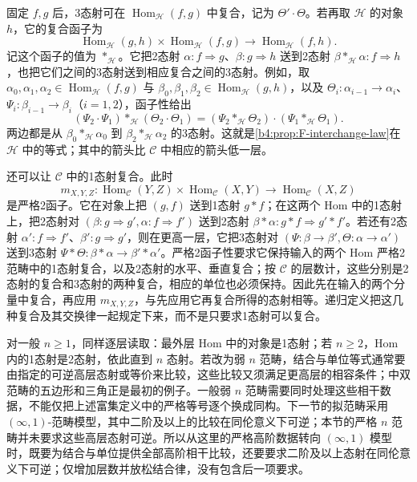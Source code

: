 \ProseParagraphBreak

固定 \(f,g\) 后，3态射可在 \(\operatorname{Hom}_{\mathcal H}(f,g)\) 中复合，记为 \(\Theta'\cdot\Theta\)。若再取 \(\mathcal H\) 的对象 \(h\)，它的复合函子为
\[
	\operatorname{Hom}_{\mathcal H}(g,h)\times \operatorname{Hom}_{\mathcal H}(f,g) \longrightarrow\operatorname{Hom}_{\mathcal H}(f,h).
\]
记这个函子的值为 \(*_{\mathcal H}\)。它把2态射 \(\alpha:f\Rightarrow g\)、\(\beta:g\Rightarrow h\) 送到2态射 \(\beta*_{\mathcal H}\alpha:f\Rightarrow h\)，也把它们之间的3态射送到相应复合之间的3态射。例如，取 \(\alpha_0,\alpha_1,\alpha_2\in\operatorname{Hom}_{\mathcal H}(f,g)\) 与 \(\beta_0,\beta_1,\beta_2\in\operatorname{Hom}_{\mathcal H}(g,h)\)，以及 \(\Theta_i:\alpha_{i-1}\rightarrow\alpha_i\)、\(\Psi_i:\beta_{i-1}\rightarrow\beta_i\)（\(i=1,2\)），函子性给出
\[
	(\Psi_2\cdot\Psi_1)*_{\mathcal H}(\Theta_2\cdot\Theta_1) =(\Psi_2*_{\mathcal H}\Theta_2)\cdot (\Psi_1*_{\mathcal H}\Theta_1).
\]
两边都是从 \(\beta_0*_{\mathcal H}\alpha_0\) 到 \(\beta_2*_{\mathcal H}\alpha_2\) 的3态射。这就是\cref{b4:prop:F-interchange-law}在 \(\mathcal H\) 中的等式；其中的箭头比 \(\mathcal C\) 中相应的箭头低一层。

\ProseParagraphBreak

还可以让 \(\mathcal C\) 中的1态射复合。此时
\[
	m_{X,Y,Z}:\operatorname{Hom}_{\mathcal C}(Y,Z)\times \operatorname{Hom}_{\mathcal C}(X,Y) \longrightarrow\operatorname{Hom}_{\mathcal C}(X,Z)
\]
是严格2函子。它在对象上把 \((g,f)\) 送到1态射 \(g*f\)；在这两个 Hom 中的1态射上，把2态射对 \((\beta:g\Rightarrow g',\alpha:f\Rightarrow f')\) 送到2态射 \(\beta*\alpha:g*f\Rightarrow g'*f'\)。若还有2态射 \(\alpha':f\Rightarrow f'\)、\(\beta':g\Rightarrow g'\)，则在更高一层，它把3态射对 \((\Psi:\beta\rightarrow\beta',\Theta:\alpha\rightarrow\alpha')\) 送到3态射 \(\Psi*\Theta:\beta*\alpha\rightarrow\beta'*\alpha'\)。严格2函子性要求它保持输入的两个 Hom 严格2范畴中的1态射复合，以及2态射的水平、垂直复合；按 \(\mathcal C\) 的层数计，这些分别是2态射的复合和3态射的两种复合，相应的单位也必须保持。因此先在输入的两个分量中复合，再应用 \(m_{X,Y,Z}\)，与先应用它再复合所得的态射相等。递归定义把这几种复合及其交换律一起规定下来，而不是只要求1态射可以复合。

\ProseParagraphBreak

对一般 \(n\ge1\)，同样逐层读取：最外层 Hom 中的对象是1态射；若 \(n\ge2\)，Hom 内的1态射是2态射，依此直到 \(n\) 态射。若改为弱 \(n\) 范畴，结合与单位等式通常要由指定的可逆高层态射或等价来比较，这些比较又须满足更高层的相容条件；中双范畴的五边形和三角正是最初的例子。一般弱 \(n\) 范畴需要同时处理这些相干数据，不能仅把上述富集定义中的严格等号逐个换成同构。下一节的拟范畴采用 \((\infty,1)\)-范畴模型，其中二阶及以上的比较在同伦意义下可逆；本节的严格 \(n\) 范畴并未要求这些高层态射可逆。所以从这里的严格高阶数据转向 \((\infty,1)\) 模型时，既要为结合与单位提供全部高阶相干比较，还要要求二阶及以上态射在同伦意义下可逆；仅增加层数并放松结合律，没有包含后一项要求。
